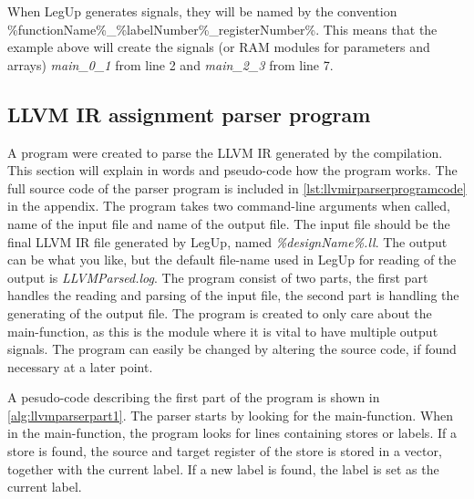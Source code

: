 When LegUp generates signals, they will be named by the convention \%functionName\%\_\%labelNumber\%\_registerNumber\%. This means that the example above will create the signals (or RAM modules for parameters and arrays) \textit{main\_0\_1} from line 2 and \textit{main\_2\_3} from line 7.
\subsection{LLVM IR assignment parser program}
A program were created to parse the LLVM IR generated by the compilation. This section will explain in words and pseudo-code how the program works. The full source code of the parser program is included in \ref{lst:llvmirparserprogramcode} in the appendix. The program takes two command-line arguments when called, name of the input file and name of the output file. The input file should be the final LLVM IR file generated by LegUp, named \textit{\%designName\%.ll}. The output can be what you like, but the default file-name used in LegUp for reading of the output is \textit{LLVMParsed.log}. The program consist of two parts, the first part handles the reading and parsing of the input file, the second part is handling the generating of the output file. The program is created to only care about the main-function, as this is the module where it is vital to have multiple output signals. The program can easily be changed by altering the source code, if found necessary at a later point.

A pesudo-code describing the first part of the program is shown in \cref{alg:llvmparserpart1}. The parser starts by looking for the main-function. When in the main-function, the program looks for lines containing stores or labels. If a store is found, the source and target register of the store is stored in a vector, together with the current label. If a new label is found, the label is set as the current label.

